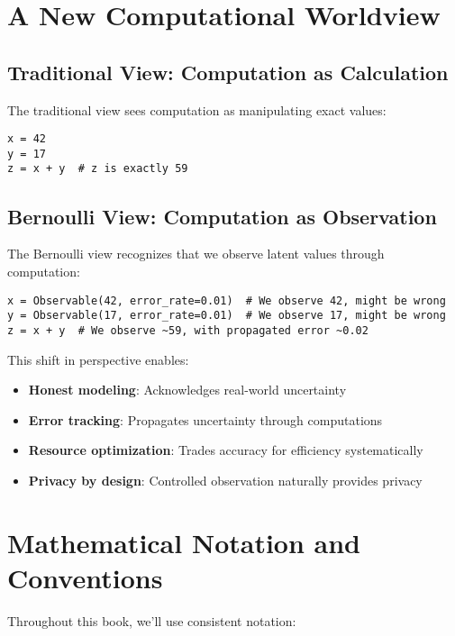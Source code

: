 \section{A New Computational Worldview}

\subsection{Traditional View: Computation as Calculation}

The traditional view sees computation as manipulating exact values:
\begin{lstlisting}
x = 42
y = 17  
z = x + y  # z is exactly 59
\end{lstlisting}

\subsection{Bernoulli View: Computation as Observation}

The Bernoulli view recognizes that we observe latent values through computation:
\begin{lstlisting}
x = Observable(42, error_rate=0.01)  # We observe 42, might be wrong
y = Observable(17, error_rate=0.01)  # We observe 17, might be wrong
z = x + y  # We observe ~59, with propagated error ~0.02
\end{lstlisting}

This shift in perspective enables:
\begin{itemize}
\item \textbf{Honest modeling}: Acknowledges real-world uncertainty
\item \textbf{Error tracking}: Propagates uncertainty through computations
\item \textbf{Resource optimization}: Trades accuracy for efficiency systematically
\item \textbf{Privacy by design}: Controlled observation naturally provides privacy
\end{itemize}

\section{Mathematical Notation and Conventions}

Throughout this book, we'll use consistent notation:

